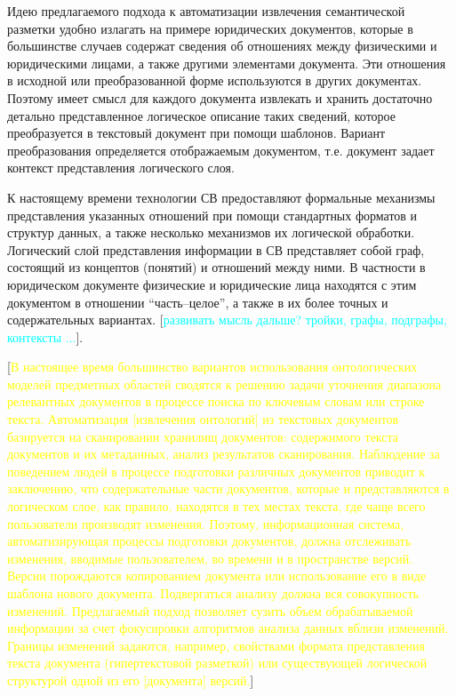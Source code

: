 \documentclass[utf8]{../IncArticle}
\newcommand{\e}[2][fcolor]{\textcolor{pcolor}{[}\textcolor{#1}{#2}\textcolor{pcolor}{]}}
\begin{document}
Идею предлагаемого подхода к автоматизации извлечения семантической
разметки удобно излагать на примере юридических документов, которые в
большинстве случаев содержат сведения об отношениях между физическими
и юридическими лицами, а также другими элементами документа.  Эти отношения в
исходной или преобразованной форме используются в других документах.
Поэтому имеет смысл для каждого документа извлекать и хранить
достаточно детально представленное логическое описание таких сведений,
которое преобразуется в текстовый документ при помощи шаблонов.
Вариант преобразования определяется отображаемым документом,
т.е. документ задает контекст представления логического слоя.

К настоящему времени технологии СВ предоставляют формальные механизмы
представления указанных отношений при помощи стандартных форматов и
структур данных, а также несколько механизмов их логической обработки.
Логический слой представления информации в СВ представляет собой граф,
состоящий из концептов (понятий) и отношений между ними.  В частности
в юридическом документе физические и юридические лица находятся с этим
документом в отношении ``часть--целое'', а также в их более точных и
содержательных вариантах.  \e[cyan]{развивать мысль
  дальше? тройки, графы, подграфы, контексты ...}.

\e[yellow]{В настоящее время большинство вариантов использования онтологических
моделей предметных областей сводятся к решению задачи уточнения
диапазона релевантных документов в процессе поиска по ключевым словам
или строке текста.  Автоматизация
\e{извлечения онтологий} из текстовых документов базируется на
сканировании хранилищ документов: содержимого текста документов и их
метаданных, анализ результатов сканирования.  Наблюдение за поведением
людей в процессе подготовки различных документов приводит к
заключению, что содержательные части документов, которые и
представляются в логическом слое, как правило, находятся в тех местах
текста, где чаще всего пользователи производят изменения.  Поэтому,
информационная система, автоматизирующая процессы подготовки
документов, должна отслеживать изменения, вводимые пользователем, во
времени и в пространстве версий.  Версии порождаются копированием
документа или использование его в виде шаблона нового
документа.  Подвергаться анализу должна вся совокупность
изменений.  Предлагаемый подход позволяет сузить объем обрабатываемой
информации за счет фокусировки алгоритмов анализа данных вблизи
изменений.  Границы изменений задаются, например, свойствами формата
представления текста документа (гипертекстовой разметкой) или
существующей логической структурой одной из его \e{документа} версий.}
\end{document}
